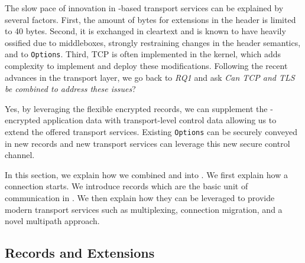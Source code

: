 


The slow pace of innovation in \tcp-based transport services can be explained by 
several factors. First, the amount of bytes for extensions in the \tcp header is
limited to 40 bytes. Second, it is exchanged in cleartext and is known to have heavily
ossified due to middleboxes, strongly restraining changes in the header semantics, and to \tcp \texttt{Options}. Third, TCP is often implemented in the kernel, 
which adds complexity to implement and deploy these modifications. Following the
recent advances in the transport layer, we go back to {\small{\textit{RQ1}}}
and ask \textit{Can TCP and TLS be combined to address these issues}?

Yes, by leveraging the
flexible encrypted \tls records, we can supplement the \tls-encrypted application data
with transport-level control data allowing us to extend the offered transport services.
Existing \tcp \texttt{Options} can be securely conveyed in new \tls records and 
new transport services can leverage this new secure control channel.

In this section, we explain how we combined \tcp and \tls into \tcpls. We first explain how
a \tcpls connection starts. We introduce
\tcpls records which are the basic unit of communication in \tcpls. We then explain
how they can be leveraged to provide modern transport services such as multiplexing,
connection migration, and a novel multipath approach.


\subsection{\tls Records and Extensions}

